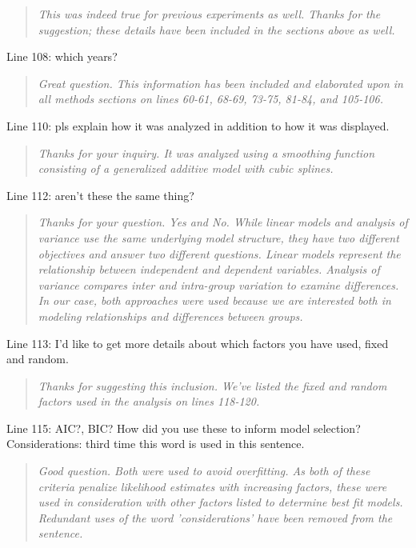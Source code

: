 \documentclass{article}
\begin{document}
\begin{quote}
    \textit{This was indeed true for previous experiments as well.  Thanks for the suggestion; these details have been included in the sections above as well.  }
\end{quote}

Line 108: which years?

\begin{quote}
    \textit{Great question.  This information has been included and elaborated upon in all methods sections on lines 60-61, 68-69, 73-75, 81-84, and 105-106. 
    }
\end{quote}

Line 110: pls explain how it was analyzed in addition to how it was displayed.

\begin{quote}
    \textit{Thanks for your inquiry.  It was analyzed using a smoothing function consisting of a generalized additive model with cubic splines.  }
\end{quote}

Line 112: aren't these the same thing?

\begin{quote}
    \textit{Thanks for your question.  Yes and No.  While linear models and analysis of variance use the same underlying model structure, they have two different objectives and answer two different questions.  Linear models represent the relationship between independent and dependent variables.  Analysis of variance compares inter and intra-group variation to examine differences.  In our case, both approaches were used because we are interested both in modeling relationships and differences between groups.  }
\end{quote}

Line 113: I'd like to get more details about which factors you have used, fixed and random.  

\begin{quote}
    \textit{Thanks for suggesting this inclusion.  We've listed the fixed and random factors used in the analysis on lines 118-120.
    }
\end{quote}

Line 115: AIC?, BIC? How did you use these to inform model selection? Considerations: third time this word is used in this sentence.  

\begin{quote}
    \textit{Good question.  Both were used to avoid overfitting.  As both of these criteria penalize likelihood estimates with increasing factors, these were used in consideration with other factors listed to determine best fit models.  Redundant uses of the word 'considerations' have been removed from the sentence.  
    }
\end{quote}
\end{document}
